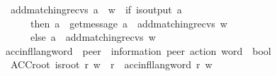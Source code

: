 \begin{isabellebody}
\ \ {\isachardoublequoteopen}add{\isacharunderscore}{\kern0pt}matching{\isacharunderscore}{\kern0pt}recvs\ {\isacharparenleft}{\kern0pt}a\ {\isacharhash}{\kern0pt}\ w{\isacharparenright}{\kern0pt}\ {\isacharequal}{\kern0pt}\ {\isacharparenleft}{\kern0pt}if\ is{\isacharunderscore}{\kern0pt}output\ a\isanewline
\ \ \ \ \ \ then\ a\ {\isacharhash}{\kern0pt}\ {\isacharparenleft}{\kern0pt}{\isacharquery}{\kern0pt}{\isasymlangle}get{\isacharunderscore}{\kern0pt}message\ a{\isasymrangle}{\isacharparenright}{\kern0pt}\ {\isacharhash}{\kern0pt}\ add{\isacharunderscore}{\kern0pt}matching{\isacharunderscore}{\kern0pt}recvs\ w\ \isanewline
\ \ \ \ \ \ else\ a\ {\isacharhash}{\kern0pt}\ add{\isacharunderscore}{\kern0pt}matching{\isacharunderscore}{\kern0pt}recvs\ w{\isacharparenright}{\kern0pt}{\isachardoublequoteclose}%
\isadelimdocument
%
\endisadelimdocument
%
\isatagdocument
%
\isamarkuptrue%
%
\endisatagdocument
{\isafolddocument}%
%
\isadelimdocument
%
\endisadelimdocument
{}\isamarkupfalse%
\ acc{\isacharunderscore}{\kern0pt}infl{\isacharunderscore}{\kern0pt}lang{\isacharunderscore}{\kern0pt}word\ {\isacharcolon}{\kern0pt}{\isacharcolon}{\kern0pt}\ {\isachardoublequoteopen}{\isacharprime}{\kern0pt}peer\ {\isasymRightarrow}\ {\isacharparenleft}{\kern0pt}{\isacharprime}{\kern0pt}information{\isacharcomma}{\kern0pt}\ {\isacharprime}{\kern0pt}peer{\isacharparenright}{\kern0pt}\ action\ word\ {\isasymRightarrow}\ bool{\isachardoublequoteclose}\ \isanewline
\ \ ACC{\isacharunderscore}{\kern0pt}root{\isacharcolon}{\kern0pt}\ {\isachardoublequoteopen}{\isasymlbrakk}is{\isacharunderscore}{\kern0pt}root\ r{\isacharsemicolon}{\kern0pt}\ w\ {\isasymin}\ {\isasymL}\isactrlsup {\isacharasterisk}{\kern0pt}{\isacharparenleft}{\kern0pt}r{\isacharparenright}{\kern0pt}{\isasymrbrakk}\ {\isasymLongrightarrow}\ acc{\isacharunderscore}{\kern0pt}infl{\isacharunderscore}{\kern0pt}lang{\isacharunderscore}{\kern0pt}word\ r\ w{\isachardoublequoteclose}\ {\isacharbar}{\kern0pt}\ %
\isanewline

\end{isabellebody}
